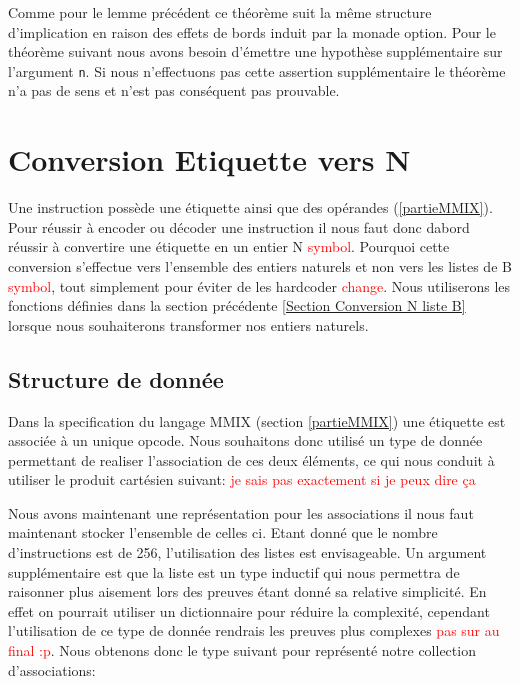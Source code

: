 \documentclass {article}
\newcommand{\codefrom}[3]
           {}
\theoremstyle{definition}
\theoremstyle{remark}
\newcommand{\todo}[1]{\textcolor{red}{#1}}
\newcommand{\fun}[1]{\lstinline!#1!}
\begin{document}
\codefrom{src}{binary}{nbitn}

Comme pour le lemme précédent ce théorème suit la même structure d'implication en raison des effets
de bords induit par la monade option.
Pour le théorème suivant nous avons besoin d'émettre une hypothèse supplémentaire sur l'argument
\fun{n}. Si nous n'effectuons pas cette assertion supplémentaire le
théorème n'a pas de sens et n'est pas conséquent pas prouvable.

\codefrom{src}{binary}{bitnbit}





\section{Conversion Etiquette vers N}
\label{partieOpcode}

Une instruction possède une étiquette ainsi que des opérandes (\ref{partieMMIX}).
Pour réussir à encoder ou décoder une instruction il nous faut donc dabord
réussir à convertire une étiquette en un entier N \todo{symbol}.
Pourquoi cette conversion s'effectue vers l'ensemble des entiers naturels
et non vers les listes de B \todo{symbol}, tout simplement pour éviter
de les hardcoder \todo{change}. Nous utiliserons les fonctions définies dans
la section précédente \ref{Section Conversion N liste B} lorsque nous souhaiterons transformer nos entiers naturels.

\subsection{Structure de donnée}
\label{Structure de donnee}
Dans la specification du langage MMIX (section \ref{partieMMIX})
une étiquette est associée à un unique opcode. Nous souhaitons donc
utilisé un type de donnée permettant de realiser l'association de ces deux éléments,
ce qui nous conduit à utiliser le produit cartésien suivant: \todo{je sais pas exactement si je peux dire ça}
\codefrom{src}{association_list}{assoc}

Nous avons maintenant une représentation pour les associations il nous faut
maintenant stocker l'ensemble de celles ci. Etant donné que le nombre
d'instructions est de 256, l'utilisation des listes est envisageable.
Un argument supplémentaire est que la liste
est un type inductif qui nous permettra de raisonner plus aisement
lors des preuves étant donné sa relative simplicité. En effet on pourrait utiliser
un dictionnaire pour réduire la complexité, cependant l'utilisation de ce 
type de donnée rendrais les preuves plus complexes \todo{pas sur au final :p}.
Nous obtenons donc le type suivant pour représenté notre collection d'associations:
\end{document}
